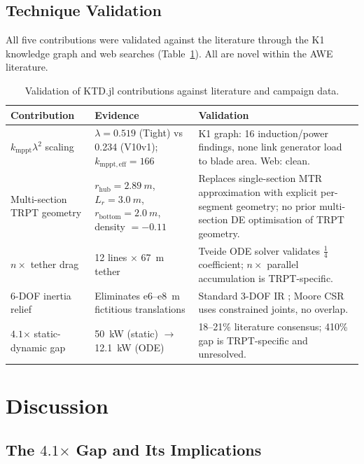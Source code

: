 \documentclass[11pt,a4paper]{article}
\begin{document}
\subsection{Technique Validation}

All five contributions were validated against the literature through the K1 knowledge graph and web searches (Table~\ref{tab:validation}). All are novel within the AWE literature.

\begin{table}[h]
\centering
\caption{Validation of KTD.jl contributions against literature and campaign data.}
\label{tab:validation}
\small
\begin{tabular}{p{3.2cm}p{3.8cm}p{5.5cm}}
\toprule
\textbf{Contribution} & \textbf{Evidence} & \textbf{Validation} \\
\midrule
$k_{\mathrm{mppt}} \lambda^2$ scaling & $\lambda = 0.519$ (Tight) vs 0.234 (V10v1); $k_{\mathrm{mppt,eff}} = 166$ & K1 graph: 16 induction/power findings, none link generator load to blade area. Web: clean. \\
Multi-section TRPT geometry & $r_{\mathrm{hub}} = 2.89~m$, $L_r = 3.0~m$, $r_{\mathrm{bottom}} = 2.0~m$, density $= -0.11$ & Replaces single-section MTR approximation with explicit per-segment geometry; no prior multi-section DE optimisation of TRPT geometry. \\
$n\times$ tether drag & 12 lines $\times$ 67~m tether & Tveide ODE solver validates $\tfrac{1}{4}$ coefficient; $n\times$ parallel accumulation is TRPT-specific. \\
6-DOF inertia relief & Eliminates e6--e8~m fictitious translations & Standard 3-DOF IR \cite{nasa1995}; Moore CSR \cite{moore2014} uses constrained joints, no overlap. \\
$4.1$$\times$ static-dynamic gap & 50~kW (static) $\to$ 12.1~kW (ODE) & 18--21\% literature consensus; 410\% gap is TRPT-specific and unresolved. \\
\bottomrule
\end{tabular}
\end{table}

\section{Discussion}

\subsection{The $4.1$$\times$ Gap and Its Implications}
\end{document}
